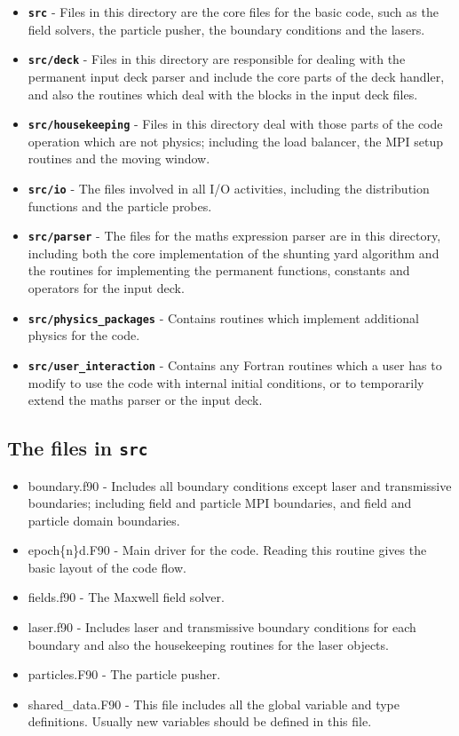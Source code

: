 \documentclass[12pt,a4paper]{article}
\newcommand{\inlinecode}[1]{{\color{warwickred} \bf\texttt{#1}}}
\newcommand{\EPOCH}{{\color{warwickdark}\fontfamily{phv}\selectfont{EPOCH}}}
\begin{document}
\begin{itemize}
\item \inlinecode{src} - Files in this directory are the core files for the
  basic {\EPOCH} code, such as the field solvers, the particle pusher, the
  boundary conditions and the lasers.
\item \inlinecode{src/deck} - Files in this directory are responsible for
  dealing with the permanent input deck parser and include the core parts of
  the deck handler, and also the routines which deal with the blocks in the
  input deck files.
\item \inlinecode{src/housekeeping} - Files in this directory deal with those
  parts of the code operation which are not physics; including the load
  balancer, the MPI setup routines and the moving window.
\item \inlinecode{src/io} - The files involved in all I/O activities, including
  the distribution functions and the particle probes.
\item \inlinecode{src/parser} - The files for the maths expression parser are
  in this directory, including both the core implementation of the shunting yard
  algorithm and the routines for implementing the permanent functions,
  constants and operators for the input deck.
\item \inlinecode{src/physics\_packages} - Contains routines which implement
  additional physics for the code.
\item \inlinecode{src/user\_interaction} - Contains any Fortran routines which
  a user has to modify to use the code with internal initial conditions, or to
  temporarily extend the maths parser or the input deck.
\end{itemize}

\subsection{The files in \inlinecode{src}}
\begin{itemize}
\item boundary.f90 - Includes all boundary conditions except laser and
  transmissive boundaries; including field and particle MPI boundaries, and
  field and particle domain boundaries.
\item epoch\{n\}d.F90 - Main driver for the code. Reading this routine gives
  the basic layout of the code flow.
\item fields.f90 - The Maxwell field solver.
\item laser.f90 - Includes laser and transmissive boundary conditions for each
  boundary and also the housekeeping routines for the laser objects.
\item particles.F90 - The particle pusher.
\item shared\_data.F90 - This file includes all the global variable and type
  definitions. Usually new variables should be defined in this file.
\end{itemize}
\end{document}
